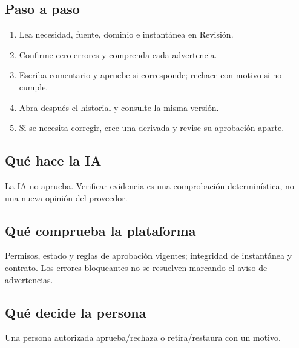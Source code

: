 \subsection{Paso a paso}
\begin{enumerate}
\item Lea necesidad, fuente, dominio e instantánea en Revisión.\par\nopagebreak[4]
\item Confirme cero errores y comprenda cada advertencia.\par\nopagebreak[4]
\item Escriba comentario y apruebe si corresponde; rechace con motivo si no cumple.\par\nopagebreak[4]
\item Abra después el historial y consulte la misma versión.\par\nopagebreak[4]
\item Si se necesita corregir, cree una derivada y revise su aprobación aparte.\par\nopagebreak[4]
\end{enumerate}
\subsection{Qué hace la IA}
La IA no aprueba. Verificar evidencia es una comprobación determinística, no una nueva opinión del proveedor.

\subsection{Qué comprueba la plataforma}
Permisos, estado y reglas de aprobación vigentes; integridad de instantánea y contrato. Los errores bloqueantes no se resuelven marcando el aviso de advertencias.

\subsection{Qué decide la persona}
Una persona autorizada aprueba/rechaza o retira/restaura con un motivo.


